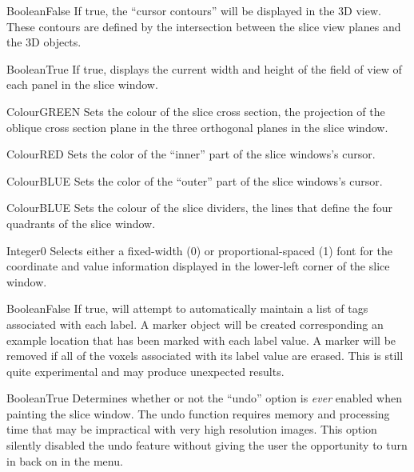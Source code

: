 


{Boolean}{False}
{If true, the ``cursor contours'' will be displayed in the 3D
  view. These contours are defined by the intersection between the slice
  view planes and the 3D objects.}{}

{Boolean}{True}
{If true, displays the current width and height of the field of view of each panel in the slice window.}{}

{Colour}{GREEN}
{Sets the colour of the slice cross section, the projection of the oblique cross section plane in the three orthogonal planes in the slice window.}{}

{Colour}{RED}
{Sets the color of the ``inner'' part of the slice windows's cursor.}{}

{Colour}{BLUE}
{Sets the color of the ``outer'' part of the slice windows's cursor.}{}

{Colour}{BLUE}
{Sets the colour of the slice dividers, the lines that define the four quadrants of the slice window.}{}

{Integer}{0}
{Selects either a fixed-width (0) or proportional-spaced (1) font for the
coordinate and value information displayed in the lower-left corner of the slice window.}{}

{Boolean}{False}
{If true, \display{} will attempt to automatically maintain a list of
 tags associated with each label. A marker object will be created
 corresponding an example location that has been marked with each label
 value. A marker will be removed if all of the voxels associated
 with its label value are erased.
 This is still quite experimental and may produce unexpected results.}{}

{Boolean}{True}
{Determines whether or not the ``undo'' option is {\em ever} enabled when painting the slice window. The undo function requires memory and processing time that may be impractical with very high resolution images. This option silently disabled the undo feature without giving the user the opportunity to turn in back on in the menu.}{}

